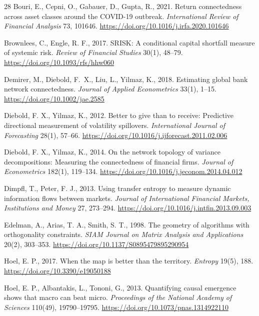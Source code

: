 \documentclass[12pt]{article}
\begin{document}
\begin{thebibliography}{28}
Bouri, E., Cepni, O., Gabauer, D., Gupta, R., 2021.
\newblock Return connectedness across asset classes around the COVID-19 outbreak.
\newblock \emph{International Review of Financial Analysis} 73, 101646. \url{https://doi.org/10.1016/j.irfa.2020.101646}

Brownlees, C., Engle, R. F., 2017.
\newblock SRISK: A conditional capital shortfall measure of systemic risk.
\newblock \emph{Review of Financial Studies} 30(1), 48--79. \url{https://doi.org/10.1093/rfs/hhw060}

Demirer, M., Diebold, F.~X., Liu, L., Yilmaz, K., 2018.
\newblock Estimating global bank network connectedness.
\newblock \emph{Journal of Applied Econometrics} 33(1), 1--15. \url{https://doi.org/10.1002/jae.2585}

Diebold, F. X., Yilmaz, K., 2012.
\newblock Better to give than to receive: Predictive directional measurement of volatility spillovers.
\newblock \emph{International Journal of Forecasting} 28(1), 57--66. \url{https://doi.org/10.1016/j.ijforecast.2011.02.006}

Diebold, F. X., Yilmaz, K., 2014.
\newblock On the network topology of variance decompositions: Measuring the connectedness of financial firms.
\newblock \emph{Journal of Econometrics} 182(1), 119--134. \url{https://doi.org/10.1016/j.jeconom.2014.04.012}

Dimpfl, T., Peter, F. J., 2013.
\newblock Using transfer entropy to measure dynamic information flows between markets.
\newblock \emph{Journal of International Financial Markets, Institutions and Money} 27, 273--294. \url{https://doi.org/10.1016/j.intfin.2013.09.003}

Edelman, A., Arias, T. A., Smith, S. T., 1998.
\newblock The geometry of algorithms with orthogonality constraints.
\newblock \emph{SIAM Journal on Matrix Analysis and Applications} 20(2), 303--353. \url{https://doi.org/10.1137/S0895479895290954}

Hoel, E. P., 2017.
\newblock When the map is better than the territory.
\newblock \emph{Entropy} 19(5), 188. \url{https://doi.org/10.3390/e19050188}

Hoel, E. P., Albantakis, L., Tononi, G., 2013.
\newblock Quantifying causal emergence shows that macro can beat micro.
\newblock \emph{Proceedings of the National Academy of Sciences} 110(49), 19790--19795. \url{https://doi.org/10.1073/pnas.1314922110}


\end{thebibliography}
\end{document}
